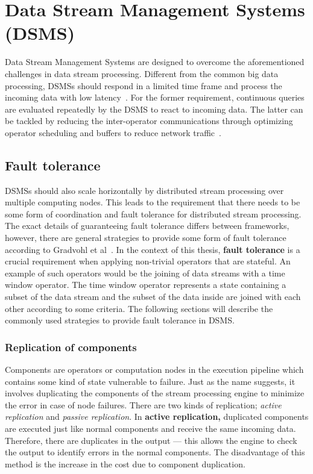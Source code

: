 \section{Data Stream Management Systems (DSMS)} 
Data Stream Management Systems are designed to overcome the aforementioned challenges 
in data stream processing. Different from the common big data processing, DSMSs should
respond in a limited time frame and process the incoming data with low latency~\cite{data_stream_management}. 
For the former requirement, continuous queries are evaluated repeatedly by the DSMS to react 
to incoming data. The latter can be tackled by reducing the inter-operator communications 
through optimizing operator scheduling and buffers to reduce network traffic~\cite{low_latency_data_stream}. 



\subsection{Fault tolerance}
DSMSs should also scale horizontally 
by distributed stream processing over multiple computing nodes. 
This leads to the requirement that there needs to be some form of coordination and fault tolerance 
for distributed stream processing. The exact details of guaranteeing fault tolerance differs between frameworks, however, there are general strategies to provide some 
form of fault tolerance according to Gradvohl et al~\cite{fault_tolerance_dsms}.
In the context of this thesis, \textbf{fault tolerance} is a crucial requirement when applying
non-trivial operators that are stateful. 
An example of such operators would be the joining of data streams with a time window operator. 
The time window operator represents a state containing a subset of the data stream and the 
subset of the data inside are joined with each other according to some criteria. 
The following sections will describe the commonly used strategies to provide fault tolerance 
in DSMS. 

\subsubsection{Replication of components}
Components are operators or computation nodes in the execution pipeline which contains 
some kind of state vulnerable to failure. 
Just as the name suggests, it involves duplicating the components of the stream processing
engine to minimize the error in case of node failures. There are two kinds of replication; 
\emph{active replication} and \emph{passive replication}. In \textbf{active replication,}
duplicated components are executed just like normal components and receive the same incoming data. 
Therefore, there are duplicates in the output --- this allows the engine to check the 
output to identify errors in the normal components. The disadvantage of this method is 
the increase in the cost due to component duplication. 

